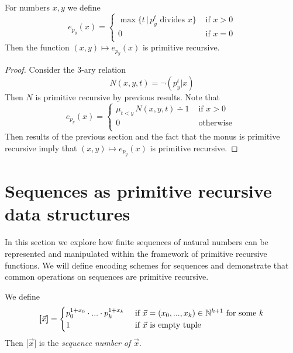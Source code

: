 \documentclass[10pt]{amsart}
\begin{document}
\begin{proposition}\label{proposition:prime_exponent_is_primitive_recursive}
	For numbers $x,y$ we define
	$$e_{p_y}(x) = \begin{cases}
			\max \big\{t\,|\,p_y^t\mbox{ divides }x\big\} & \mbox{ if }x > 0 \\
			0                                             & \mbox{ if }x = 0 \\
		\end{cases}
	$$
	Then the function $(x,y) \mapsto e_{p_y}(x)$ is primitive recursive.
\end{proposition}
\begin{proof}
	Consider the $3$-ary relation
	$$N(x,y,t) = \neg \left(p_y^t|x\right)$$
	Then $N$ is primitive recursive by previous results. Note that
	$$e_{p_y}(x) = \begin{cases}
			\mu_{t < y}\,N(x,y,t) \dotminus 1 & \mbox{ if }x > 0   \\
			0                                 & \mbox{ otherwise } \\
		\end{cases}$$
	Then results of the previous section and the fact that the monus is primitive recursive imply that $(x,y) \mapsto e_{p_y}(x)$ is primitive recursive.
\end{proof}

\section{Sequences as primitive recursive data structures}
\noindent
In this section we explore how finite sequences of natural numbers can be represented and manipulated within the framework of primitive recursive functions. We will define encoding schemes for sequences and demonstrate that common operations on sequences are primitive recursive.
\begin{definition}
	We define
	$$\pmb{[}\vec{x}\pmb{]} = \begin{cases}
			p_0^{1 + x_0}\cdot ...\cdot p_{k}^{1 + x_k} & \mbox{ if }\vec{x} = \left(x_0,...,x_k\right)\in {\mathbb N}^{k + 1}\mbox{ for some }k \\
			1                                           & \mbox{ if }\vec{x}\mbox{ is empty tuple}                                       \\
		\end{cases}
	$$
	Then $\pmb{[}\vec{x}\pmb{]}$ is the \textit{sequence number of $\vec{x}$}.
\end{definition}
\end{document}
